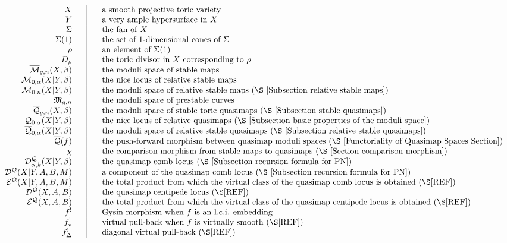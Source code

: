 \[
\begin{tabular}{ r c | c l }
$X$ & & & a smooth projective toric variety \\
$Y$ & & & a very ample hypersurface in $X$ \\
$\Sigma$ & & & the fan of $X$ \\
$\Sigma(1)$ & & & the set of $1$-dimensional cones of $\Sigma$ \\
$\rho$ & & & an element of $\Sigma(1)$ \\
$D_\rho$ & & & the toric divisor in $X$ corresponding to $\rho$ \\
$\M{g}{n}{X}{\beta}$ & & & the moduli space of stable maps \\
$\mathcal{M}_{0,\alpha}(X|Y,\beta)$ & & & the nice locus of relative stable maps \\
$\M{0}{n}{X|Y}{\beta}$ & & & the moduli space of relative stable maps (\S \ref{Subsection relative stable maps}) \\
$\MM_{g,n}$ & & & the moduli space of prestable curves \\
$\Q{g}{n}{X}{\beta}$ & & & the moduli space of stable toric quasimaps (\S \ref{Subsection stable quasimaps}) \\
$\mathcal{Q}_{0,\alpha}(X|Y,\beta)$ & & & the nice locus of relative quasimaps (\S \ref{Subsection basic properties of the moduli space}) \\
$\Q{0}{\alpha}{X|Y}{\beta}$ & & & the moduli space of relative stable quasimaps (\S \ref{Subsection relative stable quasimaps}) \\
$\om{Q}(f)$ & & & the push-forward morphism between quasimap moduli spaces (\S \ref{Functoriality of Quasimap Spaces Section}) \\
$\chi$ & & & the comparison morphism from stable maps to quasimaps (\S \ref{Section comparison morphism}) \\
$\mathcal{D}^{\mathcal{Q}}_{\alpha,k}(X|Y,\beta)$ & & & the quasimap comb locus (\S \ref{Subsection recursion formula for PN}) \\
$\mathcal{D}^{\mathcal{Q}}(X|Y,A,B,M)$ & & & a component of the quasimap comb locus (\S \ref{Subsection recursion formula for PN}) \\
$\mathcal{E}^{\mathcal{Q}}(X|Y,A,B,M)$ & & & the total product from which the virtual class of the quasimap comb locus is obtained (\S [REF]) \\
$\mathcal{D}^{\mathcal{Q}}(X,A,B)$ & & & the quasimap centipede locus (\S [REF])  \\
$\mathcal{E}^{\mathcal{Q}}(X,A,B)$ & & & the total product from which the virtual class of the quasimap centipede locus is obtained (\S [REF]) \\
$f^!$ & & & Gysin morphism when $f$ is an l.c.i. embedding \\
$f^!_{\text{v}}$ & & & virtual pull-back when $f$ is virtually smooth (\S [REF]) \\
$f^!_{\Delta}$ & & & diagonal virtual pull-back (\S [REF])
\end{tabular}
\]